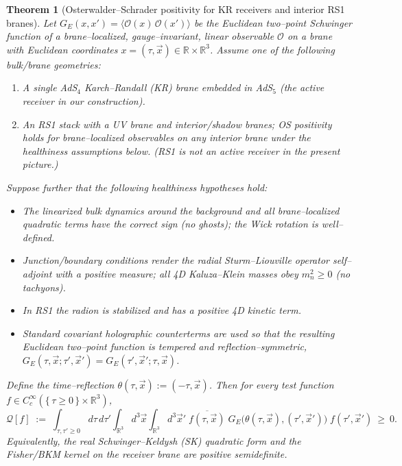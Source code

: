 \documentclass[10pt]{article}
\theoremstyle{definition}
\theoremstyle{plain}
\newtheorem{theorem}{Theorem}[section]
\begin{document}
\newcommand{\R}{\mathbb{R}}
\newcommand{\Z}{\mathbb{Z}}
\newcommand{\veps}{\varepsilon}

\begin{theorem}[Osterwalder--Schrader positivity for KR receivers and interior RS1 branes]
\label{thm:OS_receiver}
Let $G_E(x,x')=\langle \mathcal O(x)\,\mathcal O(x')\rangle$ be the Euclidean two–point
Schwinger function of a \emph{brane–localized, gauge–invariant, linear} observable
$\mathcal O$ on a brane with Euclidean coordinates $x=(\tau,\vec x)\in\R\times\R^3$.
Assume one of the following bulk/brane geometries:
\begin{enumerate}
\item[\textnormal{(KR)}] A single AdS$_4$ Karch--Randall (KR) brane embedded in AdS$_5$
(the active receiver in our construction).
\item[\textnormal{(RS1-int)}] An RS1 stack with a UV brane and interior/shadow branes;
OS positivity holds for brane--localized observables on any interior brane under the
healthiness assumptions below. (RS1 is not an active receiver in the present picture.)
\end{enumerate}
Suppose further that the following \emph{healthiness hypotheses} hold:
\begin{itemize}
\item[\textnormal{(H1)}] The linearized bulk dynamics around the background and all brane–localized
quadratic terms have the \emph{correct sign} (no ghosts); the Wick rotation is well–defined.
\item[\textnormal{(H2)}] Junction/boundary conditions render the radial Sturm–Liouville operator
self–adjoint with a positive measure; all 4D Kaluza–Klein masses obey $m_n^2\ge 0$ (no tachyons).
\item[\textnormal{(H3)}] In RS1 the radion is stabilized and has a \emph{positive} 4D kinetic term.
\item[\textnormal{(H4)}] Standard covariant holographic counterterms are used so that the resulting
Euclidean two–point function is tempered and reflection–symmetric, $G_E(\tau,\vec x;\tau',\vec x')
=G_E(\tau',\vec x';\tau,\vec x)$.
\end{itemize}
Define the time–reflection $\theta(\tau,\vec x):=(-\tau,\vec x)$. Then for every test function
$f\in C_c^\infty(\{\,\tau\ge 0\,\}\times\R^3)$,
\begin{equation}
\label{eq:OSquadratic}
\mathcal Q[f]\;:=\;\int_{\tau,\tau'\ge 0}\!\!\!\!\! d\tau\,d\tau'
\int_{\R^3}\!\! d^3\vec x \int_{\R^3}\!\! d^3\vec x'\;
\overline{f(\tau,\vec x)}\;G_E\big(\theta(\tau,\vec x),(\tau',\vec x')\big)\;f(\tau',\vec x')\ \ge\ 0.
\end{equation}
Equivalently, the real Schwinger–Keldysh (SK) quadratic form \cite{SkenderisVanRees2008} and the Fisher/BKM kernel on the receiver
brane are positive semidefinite.
\end{theorem}
\end{document}
